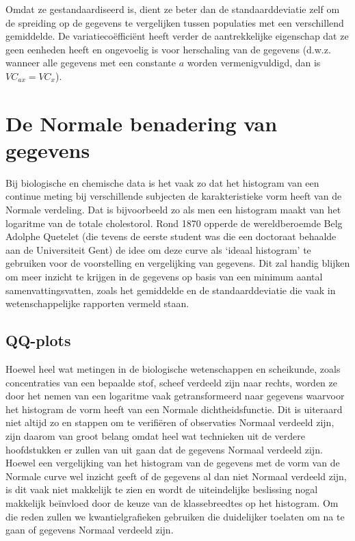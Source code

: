 \documentclass[
  12pt,dutch,coursenotes]{book}
\theoremstyle{definition}
\theoremstyle{definition}
\theoremstyle{definition}
\theoremstyle{remark}
\begin{document}
Omdat ze gestandaardiseerd is, dient ze beter dan de standaarddeviatie zelf om de spreiding op de gegevens te vergelijken tussen populaties met een verschillend gemiddelde. De variatiecoëfficiënt heeft verder de aantrekkelijke eigenschap dat ze geen eenheden heeft en ongevoelig is
voor herschaling van de gegevens (d.w.z. wanneer alle gegevens met een
constante \(a\) worden vermenigvuldigd, dan is \(VC_{ax}=VC_x\)).

\hypertarget{sec:normal}{%
\section{De Normale benadering van gegevens}\label{sec:normal}}

Bij biologische en chemische data is het vaak zo dat het histogram van een continue
meting bij verschillende subjecten de karakteristieke vorm heeft van de
Normale verdeling. Dat is bijvoorbeeld zo als men een histogram maakt van het
logaritme van de totale cholestorol. Rond 1870 opperde de wereldberoemde
Belg Adolphe Quetelet (die tevens de eerste student was die een doctoraat behaalde aan de Universiteit
Gent) de idee om deze curve als `ideaal histogram' te gebruiken voor de
voorstelling en vergelijking van gegevens. Dit zal handig blijken om meer
inzicht te krijgen in de gegevens op basis van een minimum aantal
samenvattingsvatten, zoals het gemiddelde en de standaarddeviatie die vaak
in wetenschappelijke rapporten vermeld staan.

\hypertarget{sec:qq}{%
\subsection{QQ-plots}\label{sec:qq}}

Hoewel heel wat metingen in de biologische wetenschappen en scheikunde, zoals
concentraties van een bepaalde stof, scheef verdeeld zijn naar rechts,
worden ze door het nemen van een logaritme vaak getransformeerd naar
gegevens waarvoor het histogram de vorm heeft van een Normale dichtheidsfunctie.
Dit is uiteraard niet altijd zo en stappen om te verifiëren of observaties
Normaal verdeeld zijn, zijn daarom van groot belang omdat heel wat technieken uit de verdere hoofdstukken er zullen van uit gaan dat de
gegevens Normaal verdeeld zijn. Hoewel een vergelijking van het histogram
van de gegevens met de vorm van de Normale curve wel inzicht geeft of de
gegevens al dan niet Normaal verdeeld zijn, is dit vaak niet makkelijk te
zien en wordt de uiteindelijke beslissing nogal makkelijk beïnvloed door de keuze
van de klassebreedtes op het histogram. Om die reden zullen we
kwantielgrafieken gebruiken die duidelijker toelaten om na te gaan of
gegevens Normaal verdeeld zijn.
\end{document}
